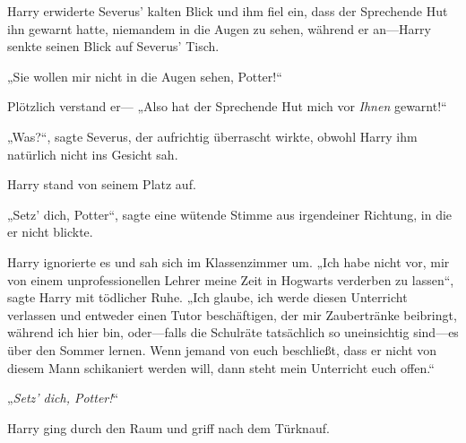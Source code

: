 Harry erwiderte Severus’ kalten Blick und ihm fiel ein, dass der Sprechende Hut ihn gewarnt hatte, niemandem in die Augen zu sehen, während er an—Harry senkte seinen Blick auf Severus’ Tisch.

„Sie wollen mir nicht in die Augen sehen, Potter!“

Plötzlich verstand er— „Also hat der Sprechende Hut mich vor \emph{Ihnen} gewarnt!“

„Was?“, sagte Severus, der aufrichtig überrascht wirkte, obwohl Harry ihm natürlich nicht ins Gesicht sah.

Harry stand von seinem Platz auf.

„Setz’ dich, Potter“, sagte eine wütende Stimme aus irgendeiner Richtung, in die er nicht blickte.

Harry ignorierte es und sah sich im Klassenzimmer um. „Ich habe nicht vor, mir von einem unprofessionellen Lehrer meine Zeit in Hogwarts verderben zu lassen“, sagte Harry mit tödlicher Ruhe. „Ich glaube, ich werde diesen Unterricht verlassen und entweder einen Tutor beschäftigen, der mir Zaubertränke beibringt, während ich hier bin, oder—falls die Schulräte tatsächlich so uneinsichtig sind—es über den Sommer lernen. Wenn jemand von euch beschließt, dass er nicht von diesem Mann schikaniert werden will, dann steht mein Unterricht euch offen.“

„\emph{Setz’ dich, Potter!}“

Harry ging durch den Raum und griff nach dem Türknauf.

